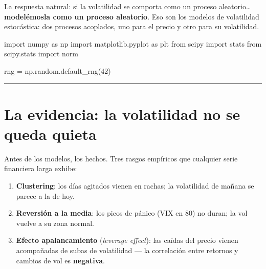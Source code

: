 \documentclass[
  spanish,
  letterpaper,
  DIV=11,
  numbers=noendperiod]{scrreprt}
\newenvironment{Shaded}{\begin{snugshade}}{\end{snugshade}}
\newcommand{\DecValTok}[1]{\textcolor[rgb]{0.68,0.00,0.00}{#1}}
\newcommand{\ImportTok}[1]{\textcolor[rgb]{0.00,0.46,0.62}{#1}}
\newcommand{\NormalTok}[1]{\textcolor[rgb]{0.00,0.23,0.31}{#1}}
\newcommand{\OperatorTok}[1]{\textcolor[rgb]{0.37,0.37,0.37}{#1}}
\providecommand{\tightlist}{%
  \setlength{\itemsep}{0pt}\setlength{\parskip}{0pt}}
\begin{document}
La respuesta natural: si la volatilidad se comporta como un proceso
aleatorio\ldots{} \textbf{modelémosla como un proceso aleatorio}. Eso
son los modelos de volatilidad estocástica: dos procesos acoplados, uno
para el precio y otro para su volatilidad.

\label{setup}
\begin{Shaded}
\begin{Highlighting}[]
\ImportTok{import}\NormalTok{ numpy }\ImportTok{as}\NormalTok{ np}
\ImportTok{import}\NormalTok{ matplotlib.pyplot }\ImportTok{as}\NormalTok{ plt}
\ImportTok{from}\NormalTok{ scipy }\ImportTok{import}\NormalTok{ stats}
\ImportTok{from}\NormalTok{ scipy.stats }\ImportTok{import}\NormalTok{ norm}

\NormalTok{rng }\OperatorTok{=}\NormalTok{ np.random.default\_rng(}\DecValTok{42}\NormalTok{)}
\end{Highlighting}
\end{Shaded}

\begin{center}\rule{0.5\linewidth}{0.5pt}\end{center}

\chapter{La evidencia: la volatilidad no se queda
quieta}\label{la-evidencia-la-volatilidad-no-se-queda-quieta}

Antes de los modelos, los hechos. Tres rasgos empíricos que cualquier
serie financiera larga exhibe:

\begin{enumerate}
\def\labelenumi{\arabic{enumi}.}
\tightlist
\item
  \textbf{Clustering}: los días agitados vienen en rachas; la
  volatilidad de mañana se parece a la de hoy.
\item
  \textbf{Reversión a la media}: los picos de pánico (VIX en 80) no
  duran; la vol vuelve a su zona normal.
\item
  \textbf{Efecto apalancamiento} (\emph{leverage effect}): las caídas
  del precio vienen acompañadas de subas de volatilidad --- la
  correlación entre retornos y cambios de vol es \textbf{negativa}.
\end{enumerate}
\end{document}
